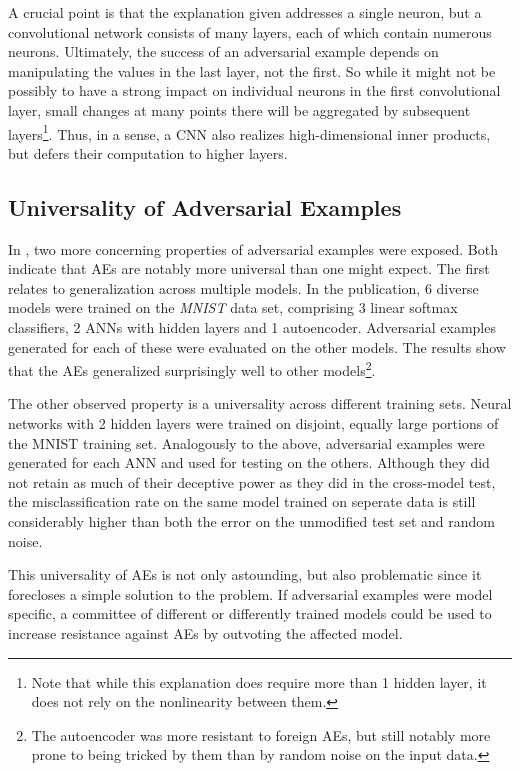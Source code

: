 \documentclass[11pt, a4paper]{article}
\begin{document}
A crucial point is that the explanation given addresses a single neuron, but a convolutional network consists of many layers, each of which contain numerous neurons. Ultimately, the success of an adversarial example depends on manipulating the values in the last layer, not the first. So while it might not be possibly to have a strong impact on individual neurons in the first convolutional layer, small changes at many points there will be aggregated by subsequent layers\footnote{Note that while this explanation does require more than 1 hidden layer, it does not rely on the nonlinearity between them.}. Thus, in a sense, a CNN also realizes high-dimensional inner products, but defers their computation to higher layers.

\subsection{Universality of Adversarial Examples}
In \cite{intriguing-properties-of-neural-networks}, two more concerning properties of adversarial examples were exposed. Both indicate that AEs are notably more universal than one might expect. The first relates to generalization across multiple models. In the publication, 6 diverse models were trained on the \emph{MNIST} data set, comprising 3 linear softmax classifiers, 2 ANNs with hidden layers and 1 autoencoder. Adversarial examples generated for each of these were evaluated on the other models. The results show that the AEs generalized surprisingly well to other models\footnote{The autoencoder was more resistant to foreign AEs, but still notably more prone to being tricked by them than by random noise on the input data.}.

The other observed property is a universality across different training sets. Neural networks with 2 hidden layers were trained on disjoint, equally large portions of the MNIST training set. Analogously to the above, adversarial examples were generated for each ANN and used for testing on the others. Although they did not retain as much of their deceptive power as they did in the cross-model test, the misclassification rate on the same model trained on seperate data is still considerably higher than both the error on the unmodified test set and random noise.

This universality of AEs is not only astounding, but also problematic since it forecloses a simple solution to the problem. If adversarial examples were model specific, a committee of different or differently trained models could be used to increase resistance against AEs by outvoting the affected model.
\end{document}
